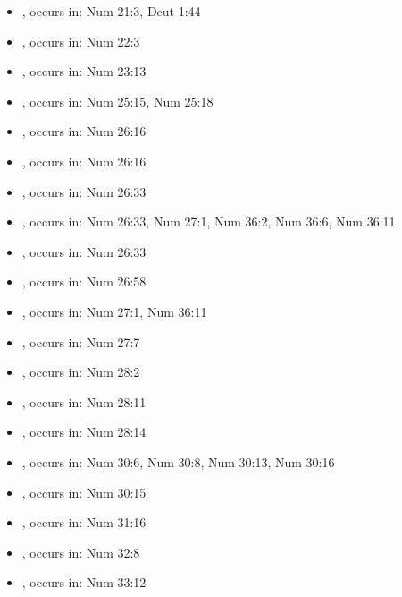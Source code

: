 \documentclass[14pt]{article}
\begin{document}
\begin{itemize}
\item {}, occurs in: Num 21:3, Deut 1:44

\item {}, occurs in: Num 22:3

\item {}, occurs in: Num 23:13

\item {}, occurs in: Num 25:15, Num 25:18

\item {}, occurs in: Num 26:16

\item {}, occurs in: Num 26:16

\item {}, occurs in: Num 26:33

\item {}, occurs in: Num 26:33, Num 27:1, Num 36:2, Num 36:6, Num 36:11

\item {}, occurs in: Num 26:33

\item {}, occurs in: Num 26:58

\item {}, occurs in: Num 27:1, Num 36:11

\item {}, occurs in: Num 27:7

\item {}, occurs in: Num 28:2

\item {}, occurs in: Num 28:11

\item {}, occurs in: Num 28:14

\item {}, occurs in: Num 30:6, Num 30:8, Num 30:13, Num 30:16

\item {}, occurs in: Num 30:15

\item {}, occurs in: Num 31:16

\item {}, occurs in: Num 32:8

\item {}, occurs in: Num 33:12


\end{itemize}
\end{document}
